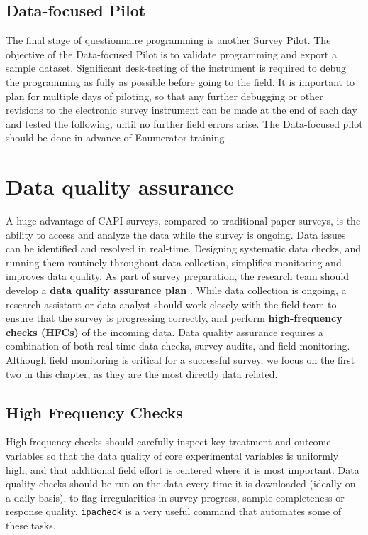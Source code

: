 {\subsection{Data-focused Pilot}
The final stage of questionnaire programming is another Survey Pilot. The objective of the Data-focused Pilot  is to validate programming and export a sample dataset. Significant desk-testing of the instrument is required to debug the programming as fully as possible before going to the field. It is important to plan for multiple days of piloting, so that any further debugging or other revisions to the electronic survey instrument can be made at the end of each day and tested the following, until no further field errors arise. The Data-focused pilot should be done in advance of Enumerator training



\section{Data quality assurance}
A huge advantage of CAPI surveys, compared to traditional paper surveys, is the ability to access and analyze the data while the survey is ongoing.
Data issues can be identified and resolved in real-time. Designing systematic data checks, and running them routinely throughout data collection, simplifies monitoring and improves data quality. 
As part of survey preparation, the research team should develop a \textbf{data quality assurance plan} . 
While data collection is ongoing, a research assistant or data analyst should work closely with the field team to ensure that the survey is progressing correctly, and perform \textbf{high-frequency checks (HFCs)} of the incoming data. 
Data quality assurance requires a combination of both real-time data checks, survey audits, and field monitoring. Although field monitoring is critical for a successful survey, we focus on the first two in this chapter, as they are the most directly data related. 


\subsection{High Frequency Checks}
High-frequency checks should carefully inspect key treatment and outcome variables so that the data quality of core experimental variables is uniformly high, and that additional field effort is centered where it is most important. 
Data quality checks should be run on the data every time it is downloaded (ideally on a daily basis), to flag irregularities in survey progress, sample completeness or response quality. \texttt{ipacheck} 
is a very useful command that automates some of these tasks.

}
